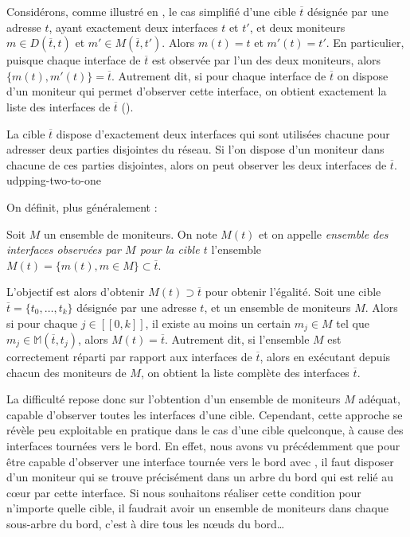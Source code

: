 Considérons, comme illustré en , le cas simplifié
d'une cible $\overline{t}$ désignée par une adresse \ip $t$, ayant exactement
deux interfaces $t$ et $t'$, et deux moniteurs $m \in D(\overline{t}, t)$ et $m'
\in M(\overline{t},t')$. Alors $m(t) = t$ et $m'(t) = t'$.
En particulier, puisque chaque interface de $\overline{t}$ est observée par l'un
des deux moniteurs, alors $\{ m(t), m'(t) \} = \overline{t}$. Autrement dit, si
pour chaque interface de $\overline{t}$ on dispose d'un moniteur qui permet
d'observer cette interface, on obtient exactement la liste des interfaces de
$\overline{t}$ ().

 {La cible $\overline{t}$ dispose d'exactement deux
interfaces qui sont utilisées chacune pour adresser deux parties disjointes du
réseau. Si l'on dispose d'un moniteur dans chacune de ces parties disjointes,
alors on peut observer les deux interfaces de $\overline{t}$.}
{udpping-two-to-one}

On définit, plus généralement :

\begin{definition}
Soit $M$ un ensemble de moniteurs. On note $M(t)$ et on appelle {\em ensemble
des interfaces observées par $M$ pour la cible $t$} l'ensemble $M(t) = \{
m(t), m \in M \} \subset \overline{t}$.
\end{definition}

L'objectif est alors d'obtenir $M(t) \supset \overline{t}$ pour obtenir
l'égalité. Soit une cible $\overline{t} = \{ t_0, \ldots, t_k \}$ désignée par
une adresse \ip $t$, et un ensemble de moniteurs $M$. Alors si pour chaque $j
\in [\![0, k]\!]$, il existe au moins un certain $m_j \in M$ tel que $m_j \in
{\mathbb M}(\overline{t}, t_j)$, alors $M(t) = \overline{t}$. Autrement dit, si l'ensemble $M$
est correctement réparti par rapport aux interfaces de $\overline{t}$, alors en
exécutant \udpping depuis chacun des moniteurs de $M$, on obtient la liste
complète des interfaces $\overline{t}$.

La difficulté repose donc sur l'obtention d'un ensemble de moniteurs $M$
adéquat, capable d'observer toutes les interfaces d'une cible. Cependant, cette
approche se révèle peu exploitable en pratique dans le cas d'une cible
quelconque, à cause des interfaces tournées vers le bord. En effet, nous avons
vu précédemment que pour être capable d'observer une interface tournée vers le
bord avec \udpping, il faut disposer d'un moniteur qui se trouve précisément
dans un arbre du bord qui est relié au c\oe{}ur par cette interface. Si nous
souhaitons réaliser cette condition pour n'importe quelle cible, il faudrait
avoir un ensemble de moniteurs dans chaque sous-arbre du bord, c'est à dire tous
les n\oe{}uds du bord\ldots

